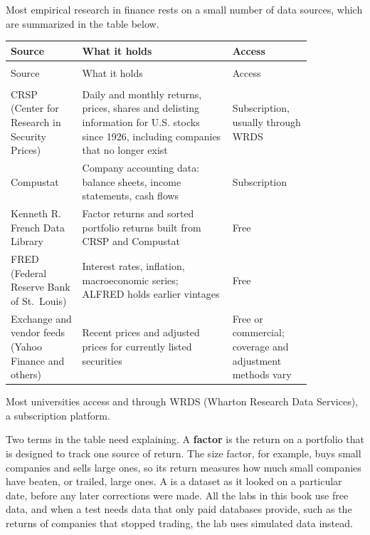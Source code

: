 Most empirical research in finance rests on a small number of data sources, which are summarized in the table below.

\begingroup
\small
\setlength{\LTpre}{6pt}\setlength{\LTpost}{6pt}
\begin{longtable}{@{}>{\raggedright\arraybackslash}p{0.2\linewidth}>{\raggedright\arraybackslash}p{0.42\linewidth}>{\raggedright\arraybackslash}p{0.22\linewidth}@{}}
\toprule
Source & What it holds & Access \\
\midrule
\endfirsthead
\multicolumn{3}{@{}l}{\emph{(continued)}}\\
\toprule
Source & What it holds & Access \\
\midrule
\endhead
\midrule
\multicolumn{3}{r@{}}{\emph{continued on next page}}\\
\endfoot
\bottomrule
\endlastfoot
CRSP (Center for Research in Security Prices) & Daily and monthly returns, prices, shares and delisting information for U.S. stocks since 1926, including companies that no longer exist & Subscription, usually through WRDS \\*
Compustat & Company accounting data: balance sheets, income statements, cash flows & Subscription \\
Kenneth R. French Data Library & Factor returns and sorted portfolio returns built from CRSP and Compustat & Free \\
FRED (Federal Reserve Bank of St.\ Louis) & Interest rates, inflation, macroeconomic series; ALFRED holds earlier vintages & Free \\*
Exchange and vendor feeds (Yahoo Finance and others) & Recent prices and adjusted prices for currently listed securities & Free or commercial; coverage and adjustment methods vary \\
\end{longtable}
\addtocounter{table}{-1}%
\endgroup

Most universities access  and  through WRDS (Wharton Research Data Services), a subscription platform.

Two terms in the table need explaining. A \textbf{factor} is the return on a portfolio that is designed to track one source of return. The size factor, for example, buys small companies and sells large ones, so its return measures how much small companies have beaten, or trailed, large ones. A  is a dataset as it looked on a particular date, before any later corrections were made. All the labs in this book use free data, and when a test needs data that only paid databases provide, such as the returns of companies that stopped trading, the lab uses simulated data instead.

